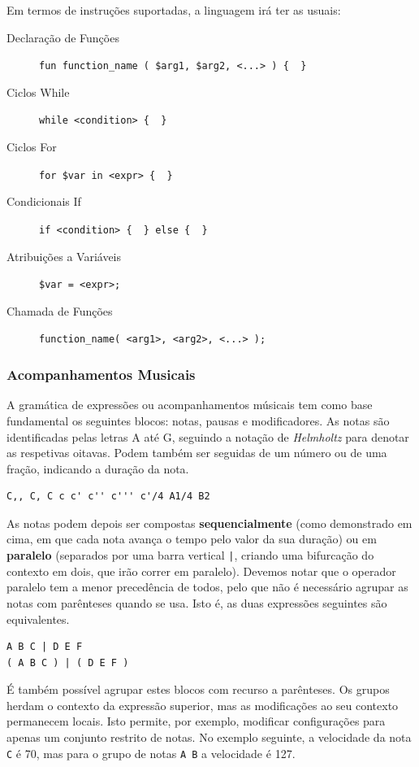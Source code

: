 Em termos de instruções suportadas, a linguagem irá ter as usuais:
\begin{description}
    \item[Declaração de Funções] \verb|fun function_name ( $arg1, $arg2, <...> ) {  }|
    \item[Ciclos While] \verb|while <condition> {  }|
    \item[Ciclos For] \verb|for $var in <expr> {  }|
    \item[Condicionais If] \verb|if <condition> {  } else {  }|
    \item[Atribuições a Variáveis] \verb|$var = <expr>;|
    \item[Chamada de Funções] \verb|function_name( <arg1>, <arg2>, <...> );|
\end{description}

\subsubsection{Acompanhamentos Musicais}
A gramática de expressões ou acompanhamentos músicais tem como base fundamental os seguintes blocos: notas, pausas e modificadores. As notas são identificadas pelas letras A até G, seguindo a notação de \textit{Helmholtz}\cite{helmholtz-pitch-notation} para denotar as respetivas oitavas. Podem também ser seguidas de um número ou de uma fração, indicando a duração da nota.

\begin{lstlisting}[caption={Exemplos de notas}]
C,, C, C c c' c'' c''' c'/4 A1/4 B2
\end{lstlisting}


As notas podem depois ser compostas \textbf{sequencialmente} (como demonstrado em cima, em que cada nota avança o tempo pelo valor da sua duração) ou em \textbf{paralelo} (separados por uma barra vertical \texttt{|}, criando uma bifurcação do contexto em dois, que irão correr em paralelo). Devemos notar que o operador paralelo tem a menor precedência de todos, pelo que não é necessário agrupar as notas com parênteses quando se usa. Isto é, as duas expressões seguintes são equivalentes.

\begin{lstlisting}
A B C | D E F
( A B C ) | ( D E F )
\end{lstlisting}

É também possível agrupar estes blocos com recurso a parênteses. Os grupos herdam o contexto da expressão superior, mas as modificações ao seu contexto permanecem locais. Isto permite, por exemplo, modificar configurações para apenas um conjunto restrito de notas. No exemplo seguinte, a velocidade da nota \texttt{C} é 70, mas para o grupo de notas \texttt{A B} a velocidade é 127.

